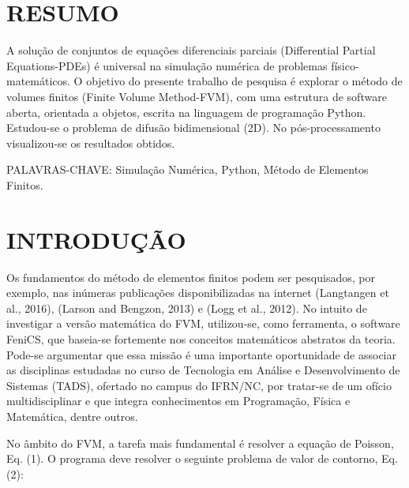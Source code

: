 \documentclass[
	6pt,					%
	openright,				%
	twoside,					%
	a4paper,					%
	english,					%
	brazil					%
	]{abntex2}
\begin{document}
	
\chapter{RESUMO}
A solução de conjuntos de equações diferenciais parciais (Differential Partial Equations-PDEs) é universal na simulação numérica de problemas físico-matemáticos. O objetivo do presente trabalho de pesquisa é explorar o método de volumes finitos (Finite Volume Method-FVM), com uma estrutura de software aberta, orientada a objetos, escrita na linguagem de programação Python. Estudou-se o problema de difusão bidimensional (2D). No pós-processamento visualizou-se os resultados obtidos.

PALAVRAS-CHAVE:  Simulação Numérica, Python, Método de Elementos Finitos.
\chapter{INTRODUÇÃO}
Os fundamentos do método de elementos finitos podem ser pesquisados, por exemplo, nas inúmeras publicações disponibilizadas na internet (Langtangen et al., 2016), (Larson and Bengzon, 2013) e (Logg et al., 2012). No intuito de investigar a versão matemática do FVM, utilizou-se, como ferramenta, o software FeniCS, que baseia-se fortemente nos conceitos matemáticos abstratos da teoria. Pode-se argumentar que essa missão é uma importante oportunidade de associar as disciplinas estudadas no curso de Tecnologia em Análise e Desenvolvimento de Sistemas (TADS), ofertado no campus do IFRN/NC, por tratar-se de um ofício multidisciplinar e que integra conhecimentos em Programação, Física e Matemática, dentre outros. 

No âmbito do FVM, a tarefa mais fundamental é resolver a equação de Poisson, Eq. (1). O programa deve resolver o seguinte problema de valor de contorno, Eq. (2):



%


%

%
\end{document}
